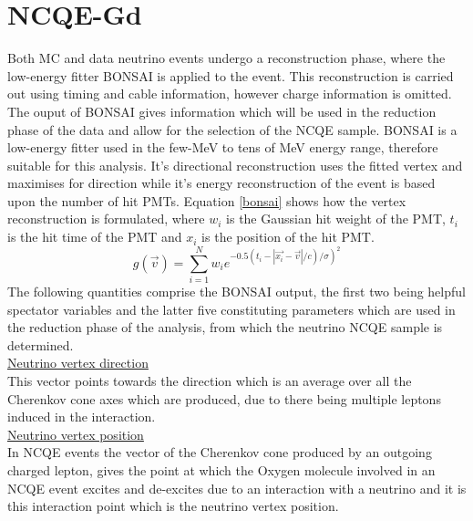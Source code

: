\chapter{NCQE-Gd}
\label{chp:ncqegd}

Both MC and data neutrino events undergo a reconstruction phase, where the low-energy fitter BONSAI is applied to the event. This reconstruction is carried out using timing and cable information, however charge information is omitted. The ouput of BONSAI gives information which will be used in the reduction phase of the data and allow for the selection of the NCQE sample. BONSAI is a low-energy fitter used in the few-MeV to tens of MeV energy range, therefore suitable for this analysis. It's directional reconstruction uses the fitted vertex and maximises for direction while it's energy reconstruction of the event is based upon the number of hit PMTs. Equation \ref{bonsai} shows how the vertex reconstruction is formulated, where $w_{i}$ is the Gaussian hit weight of the PMT, $t_{i}$ is the hit time of the PMT and $x_{i}$ is the position of the hit PMT.
\newline
\begin{equation}
\label{bonsai}
g(\vec{v})=\sum_{i=1}^{N} w_{i} e^{\left.-0.5\left(t_{i}-\left|\overrightarrow{x_{i}}-\vec{v}\right| / c\right) / \sigma\right)^{2}}
\end{equation}
The following quantities comprise the BONSAI output, the first two being helpful spectator variables and the latter five constituting parameters which are used in the reduction phase of the analysis, from which the neutrino NCQE sample is determined.\\

\underline{Neutrino vertex direction}\\

This vector points towards the direction which is an average over all the Cherenkov cone axes which are produced, due to there being multiple leptons induced in the interaction.\\



\underline{Neutrino vertex position}\\
In NCQE events the vector of the Cherenkov cone produced by an outgoing charged lepton, gives the point at which the Oxygen molecule involved in an NCQE event excites and de-excites due to an interaction with a neutrino and it is this interaction point which is the neutrino vertex position.
\newline

